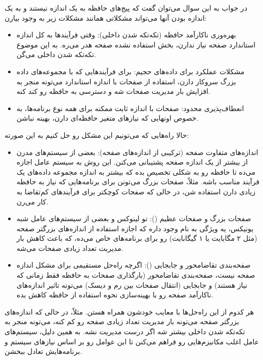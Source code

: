 در جواب به این سوال می‌توان گفت که پیج‌های حافظه به یک اندازه نیستند و به یک اندازه بودن آنها می‌تواند مشکلاتی همانند مشکلات زیر به وجود بیارن:
\begin{itemize}
    \item بهره‌وری ناکارآمد حافظه (تکه‌تکه شدن داخلی): وقتی فرآیندها به کل اندازه استاندارد صفحه نیاز ندارن، بخش استفاده نشده صفحه هدر می‌ره. به این موضوع تکه‌تکه شدن داخلی می‌گن.
    \item مشکلات عملکرد برای داده‌های حجیم: برای فرآیندهایی که با مجموعه‌های داده بزرگ سروکار دارن، استفاده از صفحات با اندازه استاندارد می‌تونه منجر به افزایش بار مدیریت صفحات شه و دسترسی به حافظه رو کند کنه.
    \item انعطاف‌پذیری محدود: صفحات با اندازه ثابت ممکنه برای همه نوع برنامه‌ها، به خصوص اونهایی که نیازهای متغیر حافظه‌ای دارن، بهینه نباشن.
\end{itemize}
حالا راه‌هایی که می‌تونیم این مشکل رو حل کنیم به این صورته:
\begin{itemize}
    \item اندازه‌های متفاوت صفحه (ترکیبی از اندازه‌های صفحه): بعضی از سیستم‌های مدرن از بیشتر از یک اندازه صفحه پشتیبانی می‌کنن. این روش به سیستم عامل اجازه می‌ده تا حافظه رو به شکلی تخصیص بده که بیشتر به اندازه مجموعه داده‌های یک فرآیند مناسب باشه. مثلاً، صفحات بزرگ می‌تونن برای برنامه‌هایی که نیاز به حافظه زیادی دارن استفاده شن، در حالی که صفحات کوچکتر برای فرآیندهای کم‌تقاضا به کار می‌رن.
    \item صفحات بزرگ و صفحات عظیم (): تو لینوکس و بعضی از سیستم‌های عامل شبه یونیکس، یه ویژگی به نام  وجود داره که اجازه استفاده از اندازه‌های بزرگتر صفحه (مثل ۲ مگابایت یا ۱ گیگابایت) رو برای برنامه‌های خاص می‌ده، که باعث کاهش بار مدیریت تعداد زیادی صفحات می‌شه.
    \item صفحه‌بندی تقاضامحور و جابجایی (): اگرچه راه‌حل مستقیمی برای مشکل اندازه صفحه نیست، صفحه‌بندی تقاضامحور (بارگذاری صفحات به حافظه فقط زمانی که نیاز هستند) و جابجایی (انتقال صفحات بین رم و دیسک) می‌تونه تاثیر اندازه‌های ناکارآمد صفحه رو با بهینه‌سازی نحوه استفاده از حافظه کاهش بده.
\end{itemize}
هر کدوم از این راه‌حل‌ها با معایب خودشون همراه هستن. مثلاً، در حالی که اندازه‌های بزرگتر صفحه می‌تونه بار مدیریت تعداد زیادی صفحه رو کم کنه، می‌تونه منجر به تکه‌تکه شدن داخلی بیشتر شه اگر درست مدیریت نشه. به همین دلیل، سیستم‌های عامل اغلب مکانیزم‌هایی رو فراهم می‌کنن تا این عوامل رو بر اساس نیازهای سیستم و برنامه‌هایش تعادل ببخشن.